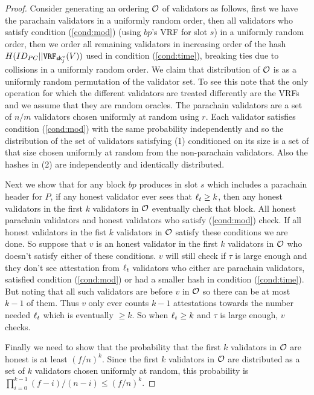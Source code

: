 \begin{proof}
Consider generating an ordering $\mathcal{O}$ of validators as follows, first we have the parachain validators in a uniformly random order, then all validators who satisfy condition (\ref{cond:mod}) (using $bp$'s VRF for slot $s$) in a uniformly random order, then we order all remaining validators in increasing order of the hash $H(ID_{PC} || \mathtt{VRF}_{\mathsf{sk}^v_j}(V))$ used in condition (\ref{cond:time}), breaking ties due to collisions in a uniformly random order. We claim that distribution of $\mathcal{O}$ is as a uniformly random permutation of the validator set. To see this note that the only operation for which the different validators are treated differently are the VRFs and we assume that they are random oracles. The parachain validators are a set of $n/m$ validators chosen uniformly at random using $r$. Each validator satisfies condition (\ref{cond:mod}) with the same probability independently and so the distribution of the set of validators satisfying (1) conditioned on its size is a set of that size chosen uniformly at random from the non-parachain validators. Also the hashes in (2) are independently and identically distributed.

Next we show that for any block $bp$ produces in slot $s$ which includes a parachain header for $P$,  if any honest validator ever sees that $\ell_t \geq k$, then any honest validators in the first $k$  validators in $\mathcal{O}$ eventually check that block. All honest parachain validators and honest validators who satisfy (\ref{cond:mod}) check. If all honest validators in the fist $k$ validators in $\mathcal{O}$ satisfy these conditions we are done. So suppose that $v$ is an honest validator in the first $k$ validators in $\mathcal{O}$ who doesn't satisfy either of these conditions. $v$ will still check if $\tau$ is large enough and they don't see attestation from $\ell_t$ validators who either are parachain validators, satisfied condition (\ref{cond:mod})  or had a smaller hash in condition (\ref{cond:time}). But noting that all such validators are before $v$ in $\mathcal{O}$ so there can be at most $k-1$ of them. Thus $v$ only ever counts $k-1$ attestations towards the number needed $\ell_t$ which is eventually $\geq k$. So when $\ell_t \geq k$ and $\tau$ is large enough, $v$ checks.

Finally we need to show that the probability that the first $k$ validators in $\mathcal{O}$ are honest is at least $(f/n)^k$. Since the first $k$ validators in $\mathcal{O}$ are distributed as a set of $k$ validators chosen uniformly at random, this probability is $\prod_{i=0}^{k-1} (f-i)/(n-i) \leq (f/n)^k$.
\end{proof}
